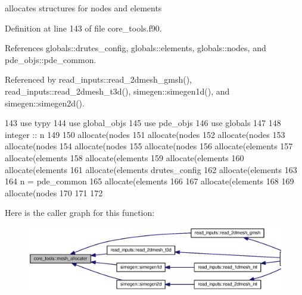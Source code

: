 allocates structures for nodes and elements 



Definition at line 143 of file core\+\_\+tools.\+f90.



References globals\+::drutes\+\_\+config, globals\+::elements, globals\+::nodes, and pde\+\_\+objs\+::pde\+\_\+common.



Referenced by read\+\_\+inputs\+::read\+\_\+2dmesh\+\_\+gmsh(), read\+\_\+inputs\+::read\+\_\+2dmesh\+\_\+t3d(), simegen\+::simegen1d(), and simegen\+::simegen2d().


\begin{DoxyCode}
143       \textcolor{keywordtype}{use }typy
144       \textcolor{keywordtype}{use }global_objs
145       \textcolor{keywordtype}{use }pde_objs
146       \textcolor{keywordtype}{use }globals
147 
148       \textcolor{keywordtype}{integer} :: n
149 
150       \textcolor{keyword}{allocate}(nodes%
151       \textcolor{keyword}{allocate}(nodes%
152       \textcolor{keyword}{allocate}(nodes%
153       \textcolor{keyword}{allocate}(nodes%
154       \textcolor{keyword}{allocate}(nodes%
155       \textcolor{keyword}{allocate}(nodes%
156       \textcolor{keyword}{allocate}(elements%
157       \textcolor{keyword}{allocate}(elements%
158       \textcolor{keyword}{allocate}(elements%
159       \textcolor{keyword}{allocate}(elements%
160       \textcolor{keyword}{allocate}(elements%
161       \textcolor{keyword}{allocate}(elements%
      drutes_config%
162 \textcolor{comment}{      }\textcolor{keyword}{allocate}(elements%
163       
164       n = pde_common%
165       \textcolor{keyword}{allocate}(elements%
166       
167       \textcolor{keyword}{allocate}(elements%
168 \textcolor{comment}{      }
169 \textcolor{comment}{      }\textcolor{keyword}{allocate}(nodes%
170 
171       
172 
\end{DoxyCode}


Here is the caller graph for this function\+:\nopagebreak
\begin{figure}[H]
\begin{center}
\leavevmode
\includegraphics[width=350pt]{namespacecore__tools_a05e8cc58b84b9391b49c5070db1160f7_icgraph}
\end{center}
\end{figure}


